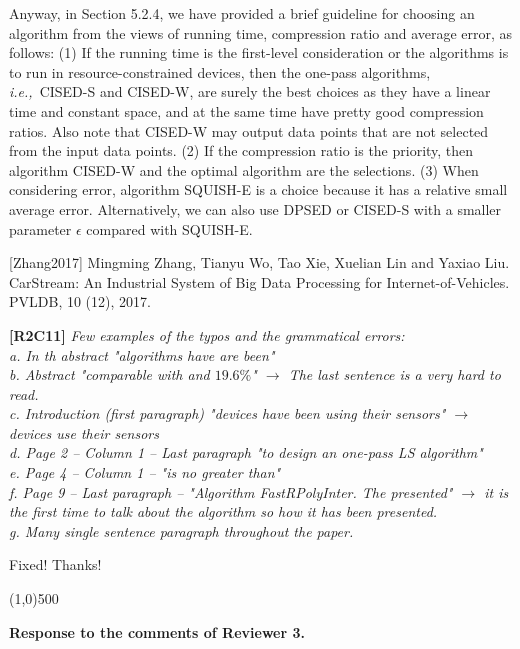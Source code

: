 \documentclass{letter}
\newcommand{\ie}{\emph{i.e.,}\xspace}
\begin{document}
Anyway, in Section 5.2.4, we have provided a brief guideline for choosing an algorithm from the views of running time, compression ratio and average error, as follows: 
(1) If the running time is the first-level consideration or the algorithms is to run in resource-constrained devices, then the one-pass algorithms, \ie~CISED-S and CISED-W, are surely the best choices as they have a linear time and constant space, and at the same time have pretty good compression ratios. Also note that CISED-W may output data points that are not selected from the input data points.
%
(2) If the compression ratio is the priority, then algorithm CISED-W and the optimal algorithm are the selections.
%
(3) When considering error, algorithm SQUISH-E is a choice because it has a relative small average error. Alternatively, we can also use DPSED or CISED-S with a smaller parameter $\epsilon$ compared with SQUISH-E.

[Zhang2017] Mingming Zhang, Tianyu Wo, Tao Xie, Xuelian Lin and Yaxiao Liu. CarStream: An Industrial System of Big Data Processing for Internet-of-Vehicles. PVLDB, 10 (12), 2017.

\textbf{[R2C11]} \emph{Few examples of the typos and the grammatical errors: \\
   a. In th abstract "algorithms have are been"	\\
   b. Abstract "comparable with and $19.6\%$" $\rightarrow$ The last sentence is a very hard to read.	\\
   c. Introduction (first paragraph) "devices have been using their sensors" $\rightarrow$ devices use their sensors	\\
   d. Page 2 -- Column 1 -- Last paragraph "to design an one-pass LS algorithm" \\
   e. Page 4 -- Column 1 -- "is no greater than" \\
   f. Page 9 -- Last paragraph -- "Algorithm FastRPolyInter. The presented" $\rightarrow$ it is the first time to talk about the algorithm so how it has been presented. \\
   g. Many single sentence paragraph throughout the paper.
}

Fixed! Thanks!


\line(1,0){500}

\textbf{Response to the comments of Reviewer 3.}
\end{document}
